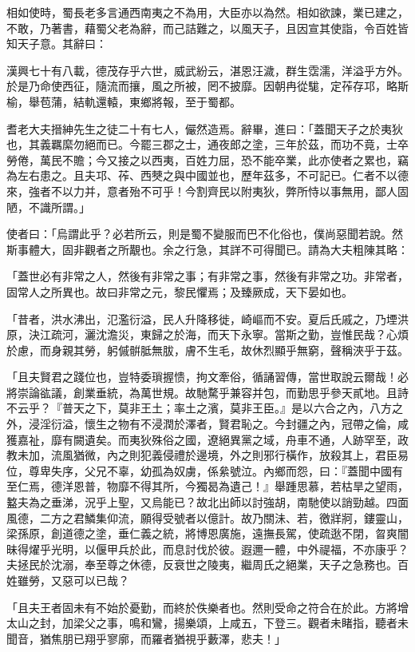\begin{pinyinscope}
相如使時，蜀長老多言通西南夷之不為用，大臣亦以為然。相如欲諫，業已建之，不敢，乃著書，藉蜀父老為辭，而己詰難之，以風天子，且因宣其使詣，令百姓皆知天子意。其辭曰：

漢興七十有八載，德茂存乎六世，威武紛云，湛恩汪濊，群生霑濡，洋溢乎方外。於是乃命使西征，隨流而攘，風之所被，罔不披靡。因朝冉從駹，定莋存邛，略斯榆，舉苞蒲，結軌還轅，東鄉將報，至于蜀都。

耆老大夫搢紳先生之徒二十有七人，儼然造焉。辭畢，進曰：「蓋聞天子之於夷狄也，其義羈縻勿絕而已。今罷三郡之士，通夜郎之塗，三年於茲，而功不竟，士卒勞倦，萬民不贍；今又接之以西夷，百姓力屈，恐不能卒業，此亦使者之累也，竊為左右患之。且夫邛、莋、西僰之與中國並也，歷年茲多，不可記已。仁者不以德來，強者不以力并，意者殆不可乎！今割齊民以附夷狄，弊所恃以事無用，鄙人固陋，不識所謂。」

使者曰：「烏謂此乎？必若所云，則是蜀不變服而巴不化俗也，僕尚惡聞若說。然斯事體大，固非觀者之所覯也。余之行急，其詳不可得聞已。請為大夫粗陳其略：

「蓋世必有非常之人，然後有非常之事；有非常之事，然後有非常之功。非常者，固常人之所異也。故曰非常之元，黎民懼焉；及臻厥成，天下晏如也。

「昔者，洪水沸出，氾濫衍溢，民人升降移徙，崎嶇而不安。夏后氏戚之，乃堙洪原，決江疏河，灑沈澹災，東歸之於海，而天下永寧。當斯之勤，豈惟民哉？心煩於慮，而身親其勞，躬傶骿胝無胈，膚不生毛，故休烈顯乎無窮，聲稱浹乎于茲。

「且夫賢君之踐位也，豈特委瑣握愦，拘文牽俗，循誦習傳，當世取說云爾哉！必將崇論谹議，創業垂統，為萬世規。故馳騖乎兼容并包，而勤思乎參天貳地。且詩不云乎？『普天之下，莫非王土；率土之濱，莫非王臣。』是以六合之內，八方之外，浸淫衍溢，懷生之物有不浸潤於澤者，賢君恥之。今封疆之內，冠帶之倫，咸獲嘉祉，靡有闕遺矣。而夷狄殊俗之國，遼絕異黨之域，舟車不通，人跡罕至，政教未加，流風猶微，內之則犯義侵禮於邊境，外之則邪行橫作，放殺其上，君臣易位，尊卑失序，父兄不辜，幼孤為奴虜，係絫號泣。內鄉而怨，曰：『蓋聞中國有至仁焉，德洋恩普，物靡不得其所，今獨曷為遺己！』舉踵思慕，若枯旱之望雨，盭夫為之垂涕，況乎上聖，又烏能已？故北出師以討強胡，南馳使以誚勁越。四面風德，二方之君鱗集仰流，願得受號者以億計。故乃關沬、若，徼牂牁，鏤靈山，梁孫原，創道德之塗，垂仁義之統，將博恩廣施，遠撫長駕，使疏逖不閉，曶爽闇昧得燿乎光明，以偃甲兵於此，而息討伐於彼。遐邇一體，中外禔福，不亦康乎？夫拯民於沈溺，奉至尊之休德，反衰世之陵夷，繼周氏之絕業，天子之急務也。百姓雖勞，又惡可以已哉？

「且夫王者固未有不始於憂勤，而終於佚樂者也。然則受命之符合在於此。方將增太山之封，加梁父之事，鳴和鸞，揚樂頌，上咸五，下登三。觀者未睹指，聽者未聞音，猶焦朋已翔乎寥廓，而羅者猶視乎藪澤，悲夫！」


\end{pinyinscope}
